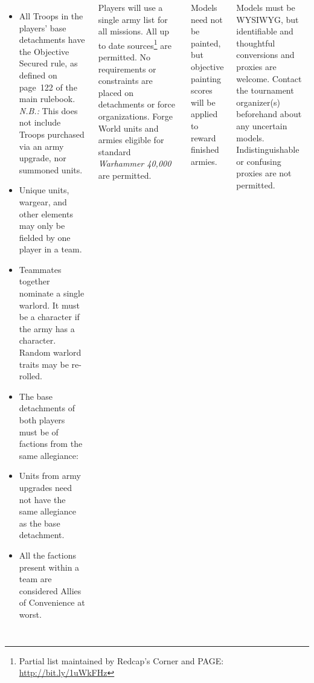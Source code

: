 \documentclass{40k}
\begin{document}
\begin{columns}
\begin{itemize}
\item All Troops in the players' base detachments have the Objective
  Secured rule, as defined on page~122 of the main rulebook.
  \emph{N.B.:} This does not include Troops purchased via an army
  upgrade, nor summoned units.

\item Unique units, wargear, and other elements may only be fielded by
  one player in a team.

\item Teammates together nominate a single warlord.  It must be a
  character if the army has a character.  Random warlord traits may be
  re-rolled.

\item The base detachments of both players must be of factions from
  the same allegiance:

\item Units from army upgrades need not have the same allegiance as
  the base detachment.

\item All the factions present within a team are considered Allies of
  Convenience at worst.
\end{itemize}


Players will use a single army list for all missions.  All up to date
sources\footnote{Partial list maintained by Redcap's Corner and PAGE:
  \url{http://bit.ly/1uWkFHz}} are permitted.  No requirements or
constraints are placed on detachments or force organizations.  Forge
World units and armies eligible for standard \emph{Warhammer 40,000}
are permitted.

Models need not be painted, but objective painting scores will be
applied to reward finished armies.

Models must be WYSIWYG, but identifiable and thoughtful conversions
and proxies are welcome.  Contact the tournament organizer(s)
beforehand about any uncertain models.  Indistinguishable or confusing
proxies are not permitted.


\end{columns}
\end{document}
